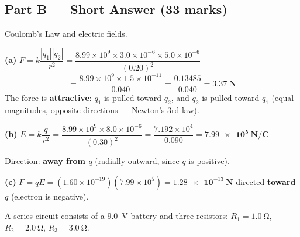 \documentclass[addpoints]{exam}
\begin{document}
\begin{questions}
\section*{Part B --- Short Answer (33 marks)}

\question Coulomb's Law and electric fields.
\begin{solution}[9cm]
\textbf{(a)} $F = k\dfrac{|q_1||q_2|}{r^2}
= \dfrac{8.99\times10^9 \times 3.0\times10^{-6} \times 5.0\times10^{-6}}{(0.20)^2}$
\[
= \frac{8.99\times10^9 \times 1.5\times10^{-11}}{0.040}
= \frac{0.13485}{0.040} = \mathbf{\SI{3.37}{N}}
\]
The force is \textbf{attractive}: $q_1$ is pulled toward $q_2$, and $q_2$ is pulled
toward $q_1$ (equal magnitudes, opposite directions — Newton's 3rd law).

\textbf{(b)} $E = k\dfrac{|q|}{r^2}
= \dfrac{8.99\times10^9 \times 8.0\times10^{-6}}{(0.30)^2}
= \dfrac{7.192\times10^4}{0.090} = \mathbf{\SI{7.99e5}{N/C}}$

Direction: \textbf{away from $q$} (radially outward, since $q$ is positive).

\textbf{(c)} $F = qE = (1.60\times10^{-19})(7.99\times10^5)
= \mathbf{\SI{1.28e-13}{N}}$ directed \textbf{toward} $q$ (electron is negative).
\end{solution}

\question A series circuit consists of a \SI{9.0}{V} battery and three resistors:
$R_1 = \SI{1.0}{\ohm}$, $R_2 = \SI{2.0}{\ohm}$, $R_3 = \SI{3.0}{\ohm}$.
\end{questions}
\end{document}

